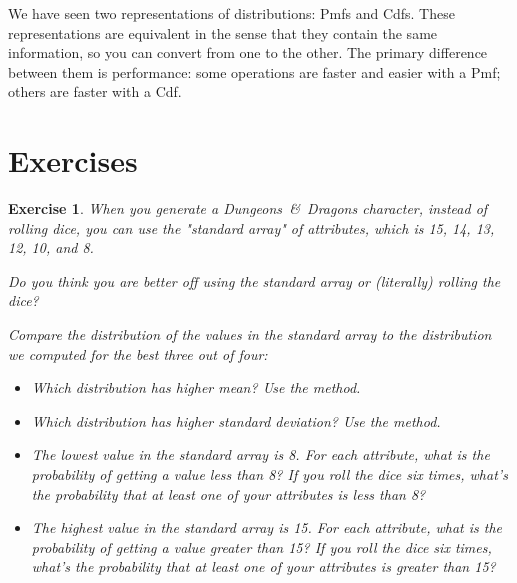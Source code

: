 \documentclass[12pt]{book}
\theoremstyle{exercise}
\newtheorem{exercise}{Exercise}[chapter]
\begin{document}
We have seen two representations of distributions: Pmfs and Cdfs.
These representations are equivalent in the sense that they contain
the same information, so you can convert from one to the other.  The
primary difference between them is performance: some operations are
faster and easier with a Pmf; others are faster with a Cdf.
 



\section{Exercises}

\begin{exercise}
When you generate a {\it Dungeons~\&~Dragons} character, instead of rolling dice, you can use the "standard array" of attributes, which is 15, 14, 13, 12, 10, and 8.

Do you think you are better off using the standard array or (literally) rolling the dice?

Compare the distribution of the values in the standard array to the distribution we computed for the best three out of four:

\begin{itemize}

\item Which distribution has higher mean?  Use the  method.

\item Which distribution has higher standard deviation?  Use the  method.

\item The lowest value in the standard array is 8.  For each attribute, what is the probability of getting a value less than 8?  If you roll the dice six times, what's the probability that at least one of your attributes is less than 8?

\item The highest value in the standard array is 15.  For each attribute, what is the probability of getting a value greater than 15?  If you roll the dice six times, what's the probability that at least one of your attributes is greater than 15?

\end{itemize}

\end{exercise}

\newcommand{\Poincare}{Poincar\'{e}}
\end{document}
